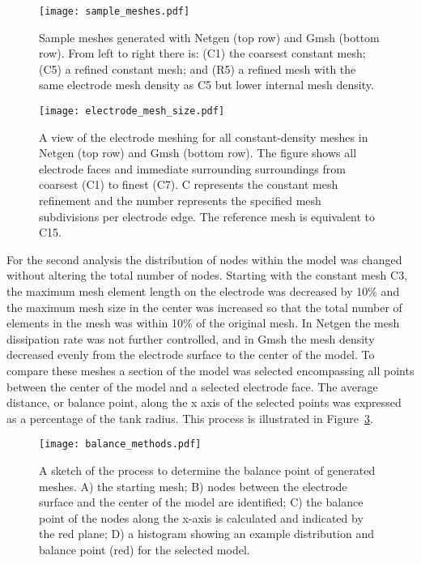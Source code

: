 \documentclass[12pt]{iopart}
\begin{document}
\begin{figure}
   \texttt{[image: sample\_meshes.pdf]}
   \caption{\label{fig:sample_meshes} Sample meshes generated with Netgen (top row)
   and Gmsh (bottom row). From left to right there is: (C1) the coarsest constant
   mesh; (C5) a refined constant mesh; and (R5) a refined mesh with the same
   electrode mesh density as C5 but lower internal mesh density.}
\end{figure}

\begin{figure}
  \texttt{[image: electrode\_mesh\_size.pdf]}
  \caption{\label{fig:electrode_mesh_size} A view of the electrode meshing for all constant-density meshes 
  in Netgen (top row) and Gmsh (bottom row). The figure shows all electrode faces and immediate surrounding
  surroundings from coarsest (C1) to finest (C7). C represents the constant mesh refinement and the number
  represents the specified mesh subdivisions per electrode edge. The reference mesh is equivalent to C15.}
\end{figure}

For the second analysis the distribution of nodes within the 
model was changed without altering 
the total number of nodes. 
Starting with the constant mesh C3, the maximum mesh element 
length on the electrode was decreased by 10\% and the maximum mesh size in the center was
increased so that the total number of elements in the mesh was  within 10\% of the 
original mesh. 
In Netgen the mesh dissipation rate was not further controlled, and in Gmsh the mesh density 
decreased evenly from the electrode surface to the center of the model. 
To compare these meshes a section of the model was selected
encompassing all points between the center of the model and a selected electrode face.
The average 
distance, or balance point, along the x axis of the selected points was expressed 
as a percentage of the tank radius.
This process is illustrated in Figure~\ref{fig:balanceMethods}.
 
\begin{figure}
  \texttt{[image: balance\_methods.pdf]}
  \caption{\label{fig:balanceMethods} A sketch of the process to determine the 
  balance point of generated meshes. A) the starting mesh; B) nodes between the
  electrode surface and the center of the model are identified; C) the 
  balance point of the nodes along the x-axis is calculated and indicated 
  by the red plane; D) a histogram showing an example distribution and balance point (red)
  for the selected model.}
\end{figure}
\end{document}
